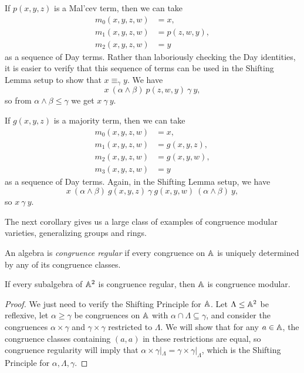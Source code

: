 \begin{appendices}
\begin{comment}
If $\cV$ is idempotent, then we also have $\alpha \circ \beta = 1$, and $\cF_{\cV}(x,y,z,w)/\alpha \wedge \beta \cong \cF_{\cV}(x,y,z,w)/\alpha \times \cF_{\cV}(x,y,z,w)/\beta \cong \cF_{\cV}(x,y)^2$. Then $\theta$ is the congruence corresponding to $\gamma/\alpha \wedge \beta$ under this isomorphism, so we get the displayed equations involving $\theta$.
\end{proof}
\end{comment}

\begin{ex} If $p(x,y,z)$ is a Mal'cev term, then we can take
\begin{align*}
m_0(x,y,z,w) &= x,\\
m_1(x,y,z,w) &= p(z,w,y),\\
m_2(x,y,z,w) &= y
\end{align*}
as a sequence of Day terms. Rather than laboriously checking the Day identities, it is easier to verify that this sequence of terms can be used in the Shifting Lemma setup to show that $x \equiv_\gamma y$. We have
\[
x\ (\alpha \wedge \beta)\ p(z,w,y)\ \gamma\ y,
\]
so from $\alpha \wedge \beta \le \gamma$ we get $x\ \gamma\ y$.
\end{ex}

\begin{ex} If $g(x,y,z)$ is a majority term, then we can take
\begin{align*}
m_0(x,y,z,w) &= x,\\
m_1(x,y,z,w) &= g(x,y,z),\\
m_2(x,y,z,w) &= g(x,y,w),\\
m_3(x,y,z,w) &= y
\end{align*}
as a sequence of Day terms. Again, in the Shifting Lemma setup, we have
\[
x\ (\alpha\wedge\beta)\ g(x,y,z)\ \gamma\ g(x,y,w)\ (\alpha\wedge\beta)\ y,
\]
so $x\ \gamma\ y$.
\end{ex}

The next corollary gives us a large class of examples of congruence modular varieties, generalizing groups and rings.

\begin{defn} An algebra is \emph{congruence regular} if every congruence on $\mathbb{A}$ is uniquely determined by any of its congruence classes.
\end{defn}

\begin{cor} If every subalgebra of $\mathbb{A}^2$ is congruence regular, then $\mathbb{A}$ is congruence modular.
\end{cor}
\begin{proof} We just need to verify the Shifting Principle for $\mathbb{A}$. Let $\Lambda \le \mathbb{A}^2$ be reflexive, let $\alpha \ge \gamma$ be congruences on $\mathbb{A}$ with $\alpha \cap \Lambda \subseteq \gamma$, and consider the congruences $\alpha \times \gamma$ and $\gamma \times \gamma$ restricted to $\Lambda$. We will show that for any $a \in \mathbb{A}$, the congruence classes containing $(a,a)$ in these restrictions are equal, so congruence regularity will imply that $\alpha\times\gamma|_\Lambda = \gamma\times\gamma|_\Lambda$, which is the Shifting Principle for $\alpha,\Lambda,\gamma$.


\end{proof}
\end{appendices}
